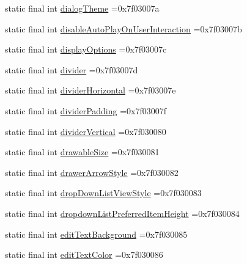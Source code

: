 \begin{DoxyCompactItemize}
static final int \mbox{\hyperlink{classcom_1_1example_1_1trainawearapplication_1_1_r_1_1attr_a18b1c7f501568c43496be3c9557d94d9}{dialog\+Theme}} =0x7f03007a
\item 
static final int \mbox{\hyperlink{classcom_1_1example_1_1trainawearapplication_1_1_r_1_1attr_ab20872c8a6437aa1d784b7ce8e35930a}{disable\+Auto\+Play\+On\+User\+Interaction}} =0x7f03007b
\item 
static final int \mbox{\hyperlink{classcom_1_1example_1_1trainawearapplication_1_1_r_1_1attr_a89cf32b7ad1c11198b9912d6adeb544a}{display\+Options}} =0x7f03007c
\item 
static final int \mbox{\hyperlink{classcom_1_1example_1_1trainawearapplication_1_1_r_1_1attr_af1ca6a71ab67ffe69064f73c4a408a07}{divider}} =0x7f03007d
\item 
static final int \mbox{\hyperlink{classcom_1_1example_1_1trainawearapplication_1_1_r_1_1attr_a1506de43173442907927fbff59d1cbc2}{divider\+Horizontal}} =0x7f03007e
\item 
static final int \mbox{\hyperlink{classcom_1_1example_1_1trainawearapplication_1_1_r_1_1attr_a52670a59f374c9261f927582e4208e2e}{divider\+Padding}} =0x7f03007f
\item 
static final int \mbox{\hyperlink{classcom_1_1example_1_1trainawearapplication_1_1_r_1_1attr_a3d2783cce6f0a3f5b1f6f86cc8d6a023}{divider\+Vertical}} =0x7f030080
\item 
static final int \mbox{\hyperlink{classcom_1_1example_1_1trainawearapplication_1_1_r_1_1attr_a9abe5d8dadb5131680b787576e225ef3}{drawable\+Size}} =0x7f030081
\item 
static final int \mbox{\hyperlink{classcom_1_1example_1_1trainawearapplication_1_1_r_1_1attr_a5316a2fabeb6c459b3e85fa509642c44}{drawer\+Arrow\+Style}} =0x7f030082
\item 
static final int \mbox{\hyperlink{classcom_1_1example_1_1trainawearapplication_1_1_r_1_1attr_ada85901929c46d26a312372372fd8f3f}{drop\+Down\+List\+View\+Style}} =0x7f030083
\item 
static final int \mbox{\hyperlink{classcom_1_1example_1_1trainawearapplication_1_1_r_1_1attr_ad130e7ff32cdaaddf1b2541f0184b55f}{dropdown\+List\+Preferred\+Item\+Height}} =0x7f030084
\item 
static final int \mbox{\hyperlink{classcom_1_1example_1_1trainawearapplication_1_1_r_1_1attr_a972c72ad67afd6c4b058907fdc6d8f21}{edit\+Text\+Background}} =0x7f030085
\item 
static final int \mbox{\hyperlink{classcom_1_1example_1_1trainawearapplication_1_1_r_1_1attr_aa1a6197ef2b71f812337d098c7671c24}{edit\+Text\+Color}} =0x7f030086

\end{DoxyCompactItemize}

